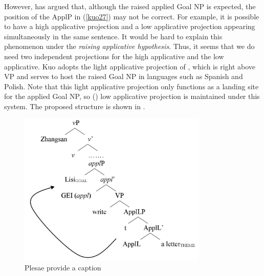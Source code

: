 \documentclass[output=paper,colorlinks,citecolor=brown]{langscibook}
\begin{document}
However, \citet{Kuo2016} has argued that, although the raised applied Goal NP is expected, the position of the ApplP in (\ref{kuo27}) may not be correct. For example, it is possible to have a high applicative projection and a low applicative projection appearing simultaneously in the same sentence. It would be hard to explain this phenomenon under the \textit{raising applicative hypothesis}. Thus, it seems that we do need two independent projections for the high applicative and the low applicative. Kuo adopts the light applicative projection of \citet{Citko2011}, which is right above VP and serves to host the raised Goal NP in languages such as Spanish and Polish. Note that this light applicative projection only functions as a landing site for the applied Goal NP, so  (\citeyear{Pylkkanen2002, Pylkkanen2008}) low applicative projection is maintained under this system. The proposed structure is shown in .

\begin{figure}
\caption{\color{red}Plesae provide a caption\label{kuo28}}
\includegraphics[width=9cm]{figures/tree.png}
\end{figure}
\end{document}
